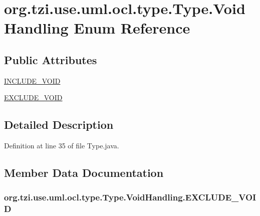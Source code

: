 \hypertarget{enumorg_1_1tzi_1_1use_1_1uml_1_1ocl_1_1type_1_1_type_1_1_void_handling}{\section{org.\-tzi.\-use.\-uml.\-ocl.\-type.\-Type.\-Void\-Handling Enum Reference}
\label{enumorg_1_1tzi_1_1use_1_1uml_1_1ocl_1_1type_1_1_type_1_1_void_handling}
}
\subsection*{Public Attributes}
\begin{DoxyCompactItemize}
\item 
\hyperlink{enumorg_1_1tzi_1_1use_1_1uml_1_1ocl_1_1type_1_1_type_1_1_void_handling_ab929cae19bbb0c16f007d34449832371}{I\-N\-C\-L\-U\-D\-E\-\_\-\-V\-O\-I\-D}
\item 
\hyperlink{enumorg_1_1tzi_1_1use_1_1uml_1_1ocl_1_1type_1_1_type_1_1_void_handling_ac4dc8eb1226f1db5389ff12d3fdc8c28}{E\-X\-C\-L\-U\-D\-E\-\_\-\-V\-O\-I\-D}
\end{DoxyCompactItemize}


\subsection{Detailed Description}


Definition at line 35 of file Type.\-java.



\subsection{Member Data Documentation}
\hypertarget{enumorg_1_1tzi_1_1use_1_1uml_1_1ocl_1_1type_1_1_type_1_1_void_handling_ac4dc8eb1226f1db5389ff12d3fdc8c28}{
\subsubsection[{E\-X\-C\-L\-U\-D\-E\-\_\-\-V\-O\-I\-D}]{\setlength{\rightskip}{0pt plus 5cm}org.\-tzi.\-use.\-uml.\-ocl.\-type.\-Type.\-Void\-Handling.\-E\-X\-C\-L\-U\-D\-E\-\_\-\-V\-O\-I\-D}}\label{enumorg_1_1tzi_1_1use_1_1uml_1_1ocl_1_1type_1_1_type_1_1_void_handling_ac4dc8eb1226f1db5389ff12d3fdc8c28}


